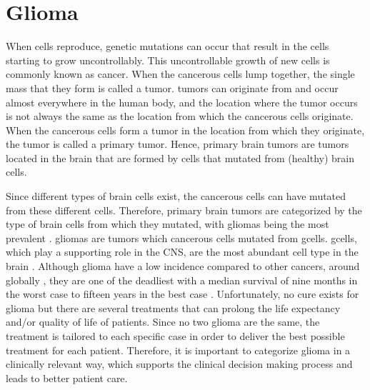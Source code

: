 \section{Glioma}

When cells reproduce, genetic mutations can occur that result in the cells starting to grow uncontrollably.
This uncontrollable growth of new cells is commonly known as cancer.
When the cancerous cells lump together, the single mass that they form is called a \gls{tumor}.
\Glspl{tumor} can originate from and occur almost everywhere in the human body, and the location where the \gls{tumor} occurs is not always the same as the location from which the cancerous cells originate.
When the cancerous cells form a \gls{tumor} in the location from which they originate, the \gls{tumor} is called a primary \gls{tumor}.
Hence, primary brain \glspl{tumor} are \glspl{tumor} located in the brain that are formed by cells that mutated from (healthy) brain cells.

Since different types of brain cells exist, the cancerous cells can have mutated from these different cells.
Therefore, primary brain \glspl{tumor} are categorized by the type of brain cells from which they mutated, with \glspl{glioma} being the most prevalent \autocite{leece2017indicence}.
\Glspl{glioma} are \glspl{tumor} which cancerous cells mutated from \glspl{gcell}.
\Glspl{gcell}, which play a supporting role in the \acrlong{CNS}, are the most abundant cell type in the brain \autocite{jakel2017glial}.
Although \gls{glioma} have a low incidence compared to other cancers, around  globally \autocite{leece2017indicence}, they are one of the deadliest with a median survival of nine months in the worst case to fifteen years in the best case \autocite{ho2014incidence, olar2015survival}.
Unfortunately, no cure exists for \gls{glioma} but there are several treatments that can prolong the life expectancy and/or quality of life of patients.
Since no two \gls{glioma} are the same, the treatment is tailored to each specific case in order to deliver the best possible treatment for each patient.
Therefore, it is important to categorize \gls{glioma} in a clinically relevant way, which supports the clinical decision making process and leads to better patient care.

